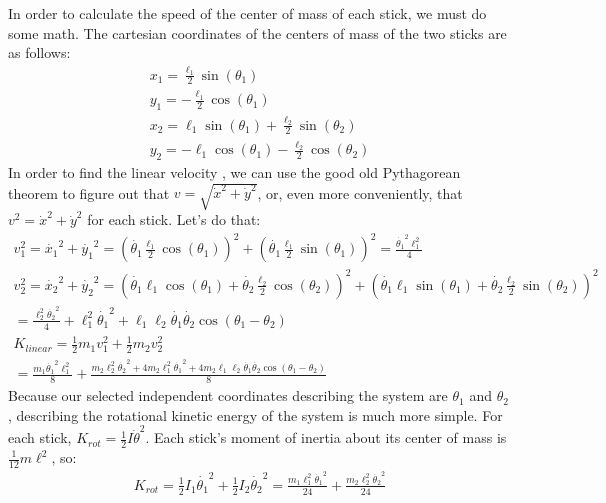 \documentclass[]{article}
\begin{document}
In order to calculate the speed of the center of mass of each stick, we must do some math. The cartesian coordinates of the centers of mass of the two sticks are as follows:
\begin{gather*}
x_1 = \frac{\ell_1}{2}\sin(\theta_1) \\
y_1 = -\frac{\ell_1}{2}\cos(\theta_1) \\
x_2 = \ell_1\sin(\theta_1) + \frac{\ell_2}{2}\sin(\theta_2) \\
y_2 = -\ell_1\cos(\theta_1) - \frac{\ell_2}{2}\cos(\theta_2)
\end{gather*}
In order to find the linear velocity , we can use the good old Pythagorean theorem to figure out that $v = \sqrt{\dot{x}^2 + \dot{y}^2}$, or, even more conveniently, that $v^2 = \dot{x}^2 + \dot{y}^2$ for each stick. Let's do that:
\begin{gather*}
	v_1^2 = \dot{x_1}^2 + \dot{y_1}^2 = (\dot{\theta_1} \frac{\ell_1}{2}\cos(\theta_1))^2 + (\dot{\theta_1} \frac{\ell_1}{2}\sin(\theta_1))^2 = \frac{\dot{\theta_1}^2\ell_1^2}{4}\\
	v_2^2 = \dot{x_2}^2 + \dot{y_2}^2 = (\dot{\theta_1}\ell_1\cos(\theta_1) + \dot{\theta_2}\frac{\ell_2}{2}\cos(\theta_2))^2 + (\dot{\theta_1}\ell_1\sin(\theta_1) + \dot{\theta_2}\frac{\ell_2}{2}\sin(\theta_2))^2 \\
	= \frac{\ell_2^2\dot{\theta_2}^2}{4} + \ell_1^2\dot{\theta_1}^2 + \ell_1\ell_2\dot{\theta_1}\dot{\theta_2}\cos(\theta_1 - \theta_2)\\
	K_{linear} = \frac{1}{2}m_1v_1^2 + \frac{1}{2}m_2v_2^2 \\
	= \frac{m_1\dot{\theta_1}^2\ell_1^2}{8} + \frac{m_2\ell_2^2\dot{\theta_2}^2 +4m_2\ell_1^2\dot{\theta_1}^2 + 4m_2\ell_1\ell_2\dot{\theta_1}\dot{\theta_2}\cos(\theta_1 - \theta_2)}{8}
\end{gather*}
Because our selected independent coordinates describing the system are $\theta_1$ and $\theta_2$, describing the rotational kinetic energy of the system is much more simple. For each stick, $K_{rot} = \frac12 I \dot{\theta}^2$. Each stick's moment of inertia about its center of mass is $\frac{1}{12} m \ell^2$, so:
\begin{gather*}
	K_{rot} = \frac12I_1\dot{\theta_1}^2 + \frac12I_2\dot{\theta_2}^2 = \frac{m_1\ell_1^2\dot{\theta_1}^2}{24} + \frac{m_2\ell_2^2\dot{\theta_2}^2}{24}
\end{gather*}
\end{document}
